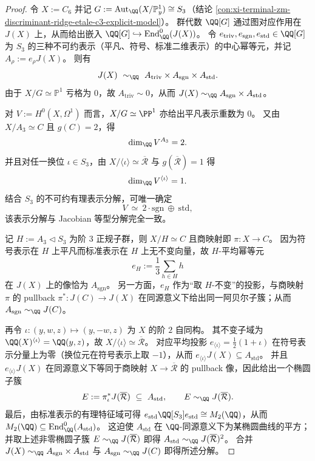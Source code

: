\begin{proof}
令 \(X:=C_6\) 并记 \(G:=\operatorname{Aut}_{\QQ}(X/\mathbb P^1_y)\cong S_3\)（结论 \ref{con:xi-terminal-zm-discriminant-ridge-etale-c3-explicit-model}）。
群代数 \(\QQ[G]\) 通过图对应作用在 \(J(X)\) 上，从而给出嵌入
\(
\QQ[G]\hookrightarrow \mathrm{End}^0_{\QQ}(J(X))
\)。
令 \(e_{\mathrm{triv}},e_{\mathrm{sgn}},e_{\mathrm{std}}\in\QQ[G]\) 为 \(S_3\) 的三种不可约表示（平凡、符号、标准二维表示）的中心幂等元，并记
\(
A_{\rho}:=e_{\rho}J(X)
\)。
则有
\[
J(X)\ \sim_{\QQ}\ A_{\mathrm{triv}}\times A_{\mathrm{sgn}}\times A_{\mathrm{std}}.
\]
由于 \(X/G\simeq\mathbb P^1\) 亏格为 \(0\)，故 \(A_{\mathrm{triv}}\sim 0\)，从而
\(
J(X)\sim_{\QQ}A_{\mathrm{sgn}}\times A_{\mathrm{std}}
\)。
\par
对 \(V:=H^0(X,\Omega^1)\) 而言，\(X/G\simeq \PP^1\) 亦给出平凡表示重数为 \(0\)。
又由 \(X/A_3\simeq C\) 且 \(g(C)=2\)，得
\[
\dim_{\QQ}V^{A_3}=2.
\]
并且对任一换位 \(\iota\in S_3\)，由 \(X/\langle\iota\rangle\simeq \overline{\mathcal R}\) 与 \(g(\overline{\mathcal R})=1\) 得
\[
\dim_{\QQ}V^{\langle\iota\rangle}=1.
\]
结合 \(S_3\) 的不可约有理表示分解，可唯一确定
\[
V\ \simeq\ 2\cdot\mathrm{sgn}\ \oplus\ \mathrm{std},
\]
该表示分解与 Jacobian 等型分解完全一致。
\par
记 \(H:=A_3\triangleleft S_3\) 为阶 \(3\) 正规子群，则 \(X/H\simeq C\) 且商映射即 \(\pi:X\to C\)。
因为符号表示在 \(H\) 上平凡而标准表示在 \(H\) 上无不变向量，故 \(H\)-平均幂等元
\[
e_H:=\frac{1}{3}\sum_{h\in H}h
\]
在 \(J(X)\) 上的像恰为 \(A_{\mathrm{sgn}}\)。
另一方面，\(e_H\) 作为“取 \(H\)-不变”的投影，与商映射 \(\pi\) 的 pullback \(\pi^\ast:J(C)\to J(X)\) 在同源意义下给出同一阿贝尔子簇；从而
\(
A_{\mathrm{sgn}}\sim_{\QQ}J(C)
\)。
\par
再令 \(\iota:(y,w,z)\mapsto(y,-w,z)\) 为 \(X\) 的阶 \(2\) 自同构。
其不变子域为 \(\QQ(X)^{\langle\iota\rangle}=\QQ(y,z)\)，故 \(X/\langle\iota\rangle\simeq \overline{\mathcal R}\)。
对应平均投影
\(
e_{\langle\iota\rangle}=\frac12(1+\iota)
\)
在符号表示分量上为零（换位元在符号表示上取 \(-1\)），从而 \(e_{\langle\iota\rangle}J(X)\subseteq A_{\mathrm{std}}\)。
并且 \(e_{\langle\iota\rangle}J(X)\) 在同源意义下等同于商映射 \(X\to\overline{\mathcal R}\) 的 pullback 像，因此给出一个椭圆子簇
\[
E:=\pi_{\iota}^{\ast}J(\overline{\mathcal R})\ \subseteq\ A_{\mathrm{std}},
\qquad
E\sim_{\QQ}J(\overline{\mathcal R}).
\]
最后，由标准表示的有理特征域可得
\(
e_{\mathrm{std}}\QQ[S_3]e_{\mathrm{std}}\cong M_2(\QQ)
\)，从而 \(M_2(\QQ)\subseteq \mathrm{End}^0_{\QQ}(A_{\mathrm{std}})\)。
这迫使 \(A_{\mathrm{std}}\) 在 \(\QQ\)-同源意义下为某椭圆曲线的平方；并取上述非零椭圆子簇 \(E\sim_{\QQ}J(\overline{\mathcal R})\) 即得
\(
A_{\mathrm{std}}\sim_{\QQ}J(\overline{\mathcal R})^2
\)。
合并 \(J(X)\sim_{\QQ}A_{\mathrm{sgn}}\times A_{\mathrm{std}}\) 与 \(A_{\mathrm{sgn}}\sim_{\QQ}J(C)\) 即得所述分解。
\end{proof}

